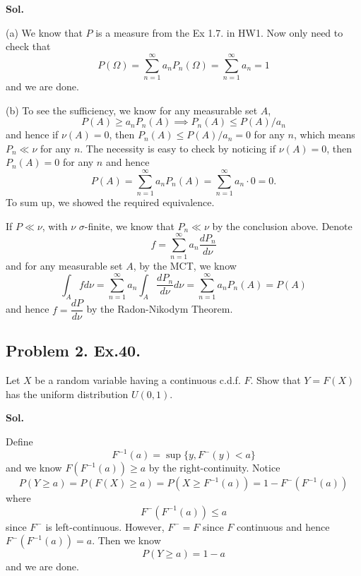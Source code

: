 \documentclass[lang=en,11pt,a4paper,citestyle=authoryear]{elegantpaper}
\begin{document}
\vspace{0.5em}
\textbf{Sol.}\par
(a) We know that $P$ is a measure from the Ex 1.7. in HW1. Now only need to check that
\[
P(\Omega) = \sum\limits_{n=1}^{\infty}a_nP_n(\Omega) = \sum\limits_{n=1}^{\infty} a_n = 1
\]
and we are done.\par
(b) To see the sufficiency, we know for any measurable set $A$,
\[P(A) \geq a_nP_n(A) \implies P_n(A )\leq P(A)/a_n\]
and hence if $\nu(A) = 0$, then $P_n(A) \leq P(A)/a_n = 0$ for any $n$, which means $P_n \ll \nu$ for any $n$. The necessity is easy to check by noticing if $\nu(A) = 0$, then $P_n(A) = 0$ for any $n$ and hence
\[
P(A) = \sum\limits_{n=1}^{\infty} a_nP_n(A) = \sum\limits_{n=1}^{\infty} a_n\cdot 0 = 0.
\]
To sum up, we showed the required equivalence.\par
If $P \ll \nu$, with $\nu$ $\sigma$-finite, we know that $P_n \ll \nu$ by the conclusion above. Denote
\[f = \sum\limits_{n=1}^{\infty} a_n \dfrac{dP_n}{d\nu}\]
and for any measurable set $A$, by the MCT, we know
\[
\int_A f d\nu = \sum\limits_{n=1}^{\infty} a_n \int_A \dfrac{dP_n}{d\nu} d\nu = \sum\limits_{n=1}^{\infty} a_nP_n(A) = P(A)
\]
and hence $f = \dfrac{dP}{d\nu}$ by the Radon-Nikodym Theorem.
\vspace{0.5em}

\subsection*{Problem 2. Ex.40.}

Let $X$ be a random variable having a continuous c.d.f. $F$. Show that
$Y = F(X)$ has the uniform distribution $U(0, 1)$.\par
\vspace{0.5em}
\textbf{Sol.}\par
Define
\[
F^{-1}(a) = \sup\{y, F^-(y) < a\}
\]
and we know $F(F^{-1}(a)) \geq a$ by the right-continuity. Notice
\[
P(Y \geq a) =  P(F(X) \geq a) = P(X \geq F^{-1}(a)) = 1 - F^-(F^{-1}(a))
\]
where 
\[
F^{-}(F^{-1}(a)) \leq a
\]
since $F^-$ is left-continuous. However, $F^- = F$ since $F$ continuous and hence $F^{-}(F^{-1}(a)) = a$. Then we know
\[
P(Y\geq a) = 1-a
\]
and we are done.
\vspace{0.5em}
\end{document}
